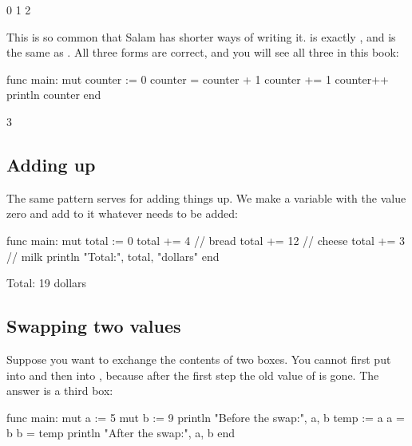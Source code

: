 \begin{salamout}
0
1
2
\end{salamout}

This is so common that Salam has shorter ways of writing it.
 is exactly , and
 is the same as . All three forms are
correct, and you will see all three in this book:

\begin{salamcode}
func main:
    mut counter := 0
    counter = counter + 1
    counter += 1
    counter++
    println counter
end
\end{salamcode}

\begin{salamout}
3
\end{salamout}

\subsection{Adding up}

The same pattern serves for adding things up. We make a variable with the
value zero and add to it whatever needs to be added:

\begin{salamcode}
func main:
    mut total := 0
    total += 4     // bread
    total += 12    // cheese
    total += 3     // milk
    println "Total:", total, "dollars"
end
\end{salamcode}

\begin{salamout}
Total: 19 dollars
\end{salamout}

\subsection{Swapping two values}

Suppose you want to exchange the contents of two boxes. You cannot first put
 into  and then  into , because after the
first step the old value of  is gone. The answer is a third box:

\begin{salamcode}
func main:
    mut a := 5
    mut b := 9
    println "Before the swap:", a, b
    temp := a
    a = b
    b = temp
    println "After the swap:", a, b
end
\end{salamcode}

